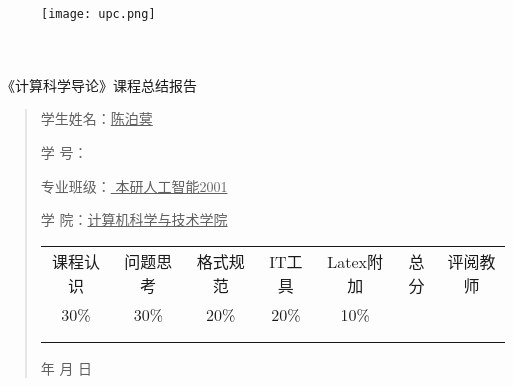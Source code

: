 \documentclass{article}
\renewcommand{\today}{\number\year 年 \number\month 月 \number\day 日}
\begin{document}
\begin{figure}
    \centering
    \texttt{[image: upc.png]}

    \label{figupc}
\end{figure}

	\begin{center}
		\quad \\
		\quad \\
		\heiti \fontsize{45}{17} \quad \quad \quad 
		\vskip 1.5cm
		\heiti {} 《计算科学导论》课程总结报告
	\end{center}
	\vskip 2.0cm
		
	\begin{quotation}
		\doublespacing
		
        \par\setlength\parindent{7em}
		\quad 

		学生姓名：\underline{\qquad  陈泊蓂 \qquad }

		学\hspace{0.61cm} 号：\underline{\qquad}
		
		专业班级：\underline{  本研人工智能2001  }
		
        学\hspace{0.61cm} 院：\underline{计算机科学与技术学院}
		\vskip 2cm
		\centering
		\begin{table}[h]
            \centering 
            \begin{tabular}{|c|c|c|c|c|c|c|}
                \hline
                课程认识 & 问题思 考 & 格式规范  & IT工具  & Latex附加  & 总分 & 评阅教师 \\
                30\% & 30\% & 20\% & 20\% & 10\% &  &  \\
                \hline
                & & & & & &\\
                & & & & & &\\
                \hline
            \end{tabular}
        \end{table}
		\vskip 2cm
		\today
	\end{quotation}

\thispagestyle{empty}
\newpage
\setcounter{page}{1}
\end{document}
